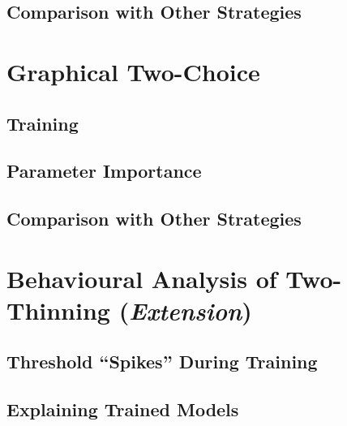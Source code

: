 \subsection{Comparison with Other Strategies}


\section{Graphical Two-Choice}


\subsection{Training}


\subsection{Parameter Importance}


\subsection{Comparison with Other Strategies}


\section{Behavioural Analysis of Two-Thinning (\textit{Extension})}


\subsection{Threshold ``Spikes'' During Training}


\subsection{Explaining Trained Models}